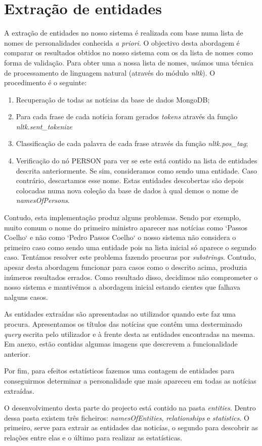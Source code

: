 \section{Extração de entidades}
A extração de entidades no nosso sistema é realizada com base numa lista de nomes de personalidades conhecida \textit{a priori}. O objectivo desta abordagem é comparar os resultados obtidos no nosso sistema com os da lista de nomes como forma de validação. Para obter uma a nossa lista de nomes, usámos uma técnica de processamento de linguagem natural (através do módulo \textit{nltk}). O procedimento é o seguinte:


\begin{enumerate}
  \item Recuperação de todas as notícias da base de dados MongoDB;
  \item Para cada frase de cada notícia foram gerados \textit{tokens} através da função \textit{nltk.sent\_tokenize}
  \item Classificação de cada palavra de cada frase através da função \textit{nltk.pos\_tag};
  \item Verificação do nó PERSON para ver se este está contido na lista de entidades descrita anteriormente. Se sim, consideramos como sendo uma entidade. Caso contrário, descartamos esse nome. Estas entidades descobertas são depois colocadas numa nova coleção da base de dados à qual demos o nome de \textit{namesOfPersons}. 
\end{enumerate}

Contudo, esta implementação produz alguns problemas. Sendo por exemplo, muito comum o nome do primeiro ministro aparecer nas notícias como `Passos Coelho` e não como `Pedro Passos Coelho` o nosso sistema não considera o primeiro caso como sendo uma entidade pois na lista inicial só aparece o segundo caso. Tentámos resolver este problema fazendo procuras por \textit{substrings}. Contudo, apesar desta abordagem funcionar para casos como o descrito acima, produzia inúmeros resultados errados. Como resultado disso, decidimos não comprometer o nosso sistema e mantivémos a abordagem inicial estando cientes que falhava nalguns casos.

As entidades extraídas são apresentadas ao utilizador quando este faz uma procura. Apresentamos os títulos das notícias que contêm uma desterminado \textit{query} escrita pelo utilizador e à frente desta as entidades encontradas na mesma. Em anexo, estão contidas algumas imagens que descrevem a funcionalidade anterior.

Por fim, para efeitos estatísticos fazemos uma contagem de entidades para conseguirmos determinar a personalidade que mais apareceu em todas as notícias extraídas.

O desenvolvimento desta parte do projecto está contido na pasta \textit{entities}. Dentro dessa pasta existem três ficheiros: \textit{namesOfEntities}, \textit{relationships} e \textit{statistics}. O primeiro, serve para extrair as entidades das noticías, o segundo para descobrir as relações entre elas e o último para realizar as estatísticas.



